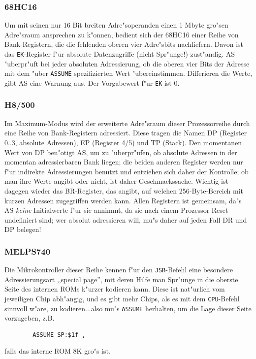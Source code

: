 \documentclass[12pt,a4paper,twoside]{report}
\newcommand{\tty}[1]{{\tt #1}}
\newcommand{\asname}{AS}
\begin{document}
\subsubsection{68HC16}

Um mit seinen nur 16 Bit breiten Adre"soperanden einen 1 Mbyte gro"sen
Adre"sraum ansprechen zu k"onnen, bedient sich der 68HC16 einer Reihe
von Bank-Registern, die die fehlenden oberen vier Adre"sbits nachliefern.
Davon ist das \tty{EK}-Register f"ur absolute Datenzugriffe (nicht
Spr"unge!) zust"andig.  \asname{} "uberpr"uft bei jeder absoluten Adressierung,
ob die oberen vier Bits der Adresse mit dem "uber \tty{ASSUME}
spezifizierten Wert "ubereinstimmen.  Differieren die Werte, gibt \asname{} eine
Warnung aus.  Der Vorgabewert f"ur \tty{EK} ist 0.


\subsubsection{H8/500}

Im Maximum-Modus wird der erweiterte Adre"sraum dieser Prozessorreihe
durch eine Reihe von Bank-Registern adressiert.  Diese tragen die
Namen DP (Register 0..3, absolute Adressen), EP (Register 4/5) und
TP (Stack).  Den momentanen Wert von DP ben"otigt \asname{}, um zu "uberpr"ufen,
ob absolute Adressen in der momentan adressierbaren Bank liegen;
die beiden anderen Register werden nur f"ur indirekte Adressierungen
benutzt und entziehen sich daher der Kontrolle; ob man ihre Werte
angibt oder nicht, ist daher Geschmackssache.  Wichtig ist dagegen
wieder das BR-Register, das angibt, auf welchen 256-Byte-Bereich
mit kurzen Adressen zugegriffen werden kann.  Allen Registern ist
gemeinsam, da"s \asname{} {\em keine} Initialwerte f"ur sie annimmt, da sie nach
einem Prozessor-Reset undefiniert sind; wer absolut adressieren
will, mu"s daher auf jeden Fall DR und DP belegen!


\subsubsection{MELPS740}

Die Mikrokontroller dieser Reihe kennen f"ur den \tty{JSR}-Befehl eine
besondere Adressierungsart ,,special page'', mit deren Hilfe man Spr"unge
in die oberste Seite des internen ROMs k"urzer kodieren kann.  Diese
ist nat"urlich vom jeweiligen Chip abh"angig, und es gibt mehr Chips,
als es mit dem \tty{CPU}-Befehl sinnvoll w"are, zu kodieren...also mu"s
\tty{ASSUME} herhalten, um die Lage dieser Seite vorzugeben, z.B.
\begin{verbatim}
        ASSUME SP:$1f ,
\end{verbatim}
falls das interne ROM 8K gro"s ist.
\end{document}
